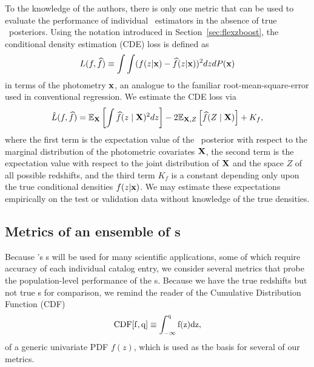 To the knowledge of the authors, there is only one metric that can be used to evaluate the performance of individual \pzpdf\ estimators in the absence of true \pz\ posteriors.
Using the notation introduced in Section~\ref{sec:flexzboost}, the conditional density estimation (CDE) loss is defined as
\begin{equation}
  \label{eq:cde-loss}
  L(f, \widehat{f}) \equiv \int \int (f(z \vert {\mathbf{x}}) - \widehat{f}(z \vert {\mathbf{x}}))^{2} dz dP({\mathbf{x}})
\end{equation}
in terms of the photometry ${\mathbf{x}}$, an analogue to the familiar root-mean-square-error used in conventional regression.
We estimate the CDE loss via
\begin{equation}
  \label{eq:estimated-cde-loss}
  \hat{L}(f, \widehat{f}) = \mathbb{E}_{\mathbf{X}} \left[\int \widehat{f}(z \mid {\mathbf{X}})^{2} dz\right] - 2 \mathbb{E}_{{\mathbf{X}}, Z}\left[\widehat{f}(Z \mid {\mathbf{X}})\right] + K_{f},
\end{equation}
where the first term is the expectation value of the \pz\ posterior with respect to the marginal distribution of the photometric covariates ${\mathbf{X}}$, the second term is the expectation value with respect to the joint distribution of ${\mathbf{X}}$ and the space $Z$ of all possible redshifts, and the third term $K_{f}$ is a constant depending only upon the true conditional densities $f(z \vert {\mathbf{x}})$.
We may estimate these expectations empirically on the test or validation data \citep[Eq.~7 in][]{Izbicki:17b} without knowledge of the true densities.

\subsection{Metrics of an ensemble of \pzpdf s}
\label{sec:qualmet}

Because \lsst's \pzpdf s will be used for many scientific applications, some of which require accuracy of each individual catalog entry, we consider several metrics that probe the population-level performance of the \pzpdf s.
Because we have the true redshifts but not true \pzpdf s for comparison, we remind the reader of the Cumulative Distribution Function (CDF)
\begin{equation}
  \label{eq:cdf}
  \rm{CDF}[f, q] \equiv \int_{-\infty}^{q} f(z) dz,
\end{equation}
of a generic univariate PDF $f(z)$, which is used as the basis for several of our metrics.

